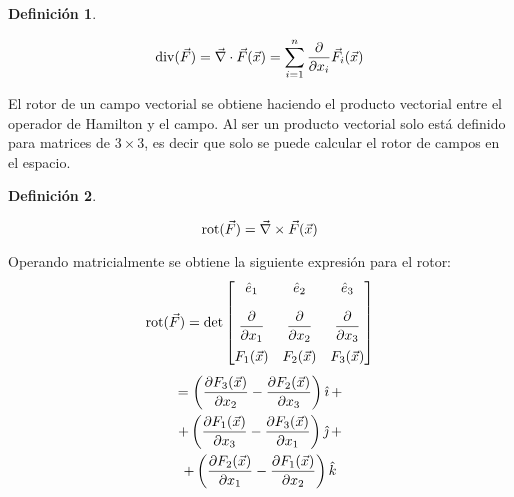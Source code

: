 \documentclass[a5paper,12pt,twoside]{book}
\newtheorem{defn}{{Definición}}[chapter]
\begin{document}
\begin{mdframed}[style=MyFrame1]
    \begin{defn}
    \end{defn}
    \begin{equation*}
        \operatorname{div}(\Vec{F}) = \Vec{\nabla} \cdot \Vec{F}(\Vec{x}) = \sum_{i=1}^n \dfrac{\partial}{\partial x_i} \Vec{F}_i(\Vec{x})
    \end{equation*}
\end{mdframed}

El rotor de un campo vectorial se obtiene haciendo el producto vectorial entre el operador de Hamilton y el campo. Al ser un producto vectorial solo está definido para matrices de $3 \times 3$, es decir que solo se puede calcular el rotor de campos en el espacio.

\begin{mdframed}[style=MyFrame1]
    \begin{defn}
    \end{defn}
    \begin{equation*}
        \operatorname{rot} (\Vec{F}) = \Vec{\nabla} \times \Vec{F}(\Vec{x})
    \end{equation*}
\end{mdframed}

Operando matricialmente se obtiene la siguiente expresión para el rotor:
\begin{equation*}
    \operatorname{rot} (\Vec{F}) = \operatorname{det}
    \begin{bmatrix}
        \hat{e}_1 & \hat{e}_2 & \hat{e}_3 \\[1em]
        \dfrac{\partial}{\partial x_1} & \dfrac{\partial}{\partial x_2} & \dfrac{\partial}{\partial x_3} \\[1em]
        F_1(\Vec{x}) & F_2(\Vec{x}) & F_3(\Vec{x})
    \end{bmatrix}
\end{equation*}
\begin{multline*}
    = \left( \dfrac{\partial F_3(\Vec{x})}{\partial x_2} - \dfrac{\partial F_2(\Vec{x})}{\partial x_3} \right) \hat{\imath} \, +
    \\
    + \left( \dfrac{\partial F_1(\Vec{x})}{\partial x_3} - \dfrac{\partial F_3(\Vec{x})}{\partial x_1} \right) \hat{\jmath} \, +
    \\ + \left( \dfrac{\partial F_2(\Vec{x})}{\partial x_1} - \dfrac{\partial F_1(\Vec{x})}{\partial x_2} \right) \hat{k}
\end{multline*}
\end{document}
